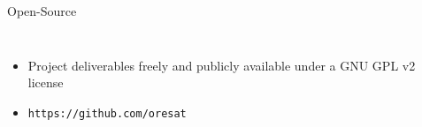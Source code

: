 \documentclass[slidestop,compress]{beamer}
\begin{document}
\begin{frame}[plain]
\begin{block}{\centering Open-Source}
\begin{columns}
\begin{itemize}
\item Project deliverables freely and publicly available under a GNU GPL v2 license
\item \texttt{https://github.com/oresat}
\end{itemize}
\end{columns}
\end{block}    
\end{frame}
\end{document}
